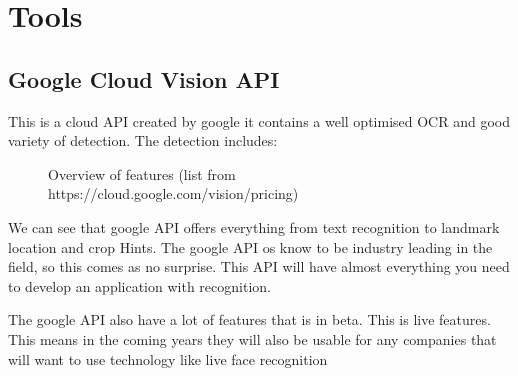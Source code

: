 \section{Tools}\label{sec:tools}
\subsection{Google Cloud Vision API}\label{subsec:API_Google}

This is a cloud API created by google it contains a well optimised OCR and good variety of detection.
The detection includes:

\begin{figure}[h]
    \caption{Overview of features (list from https://cloud.google.com/vision/pricing)}
    \label{fig:Features}
\end{figure}

We can see that google API offers everything from text recognition to landmark location and crop Hints.
The google API os know to be industry leading in the field, so this comes as no surprise.
This API will have almost everything you need to develop an application with recognition.

The google API also have a lot of features that is in beta.
This is live features.
This means in the coming years they will also be usable for any companies that will want to use technology like live face recognition
\clearpage


